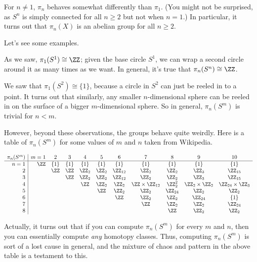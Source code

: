 For $n \neq 1$, $\pi_n$ behaves somewhat differently than $\pi_1$.
(You might not be surprised, as $S^n$ is simply connected for all $n \ge 2$ but not when $n=1$.)
In particular, it turns out that $\pi_n(X)$ is an abelian group for all $n \ge 2$.

Let's see some examples.
\begin{example}
	As we saw, $\pi_1(S^1) \cong \ZZ$; given the base circle $S^1$,
	we can wrap a second circle around it as many times as we want.
	In general, it's true that $\pi_n(S^n) \cong \ZZ$.
\end{example}
\begin{example}
	We saw that $\pi_1(S^2) \cong \{1\}$, because 
	a circle in $S^2$ can just be reeled in to a point.
	It turns out that similarly, any smaller $n$-dimensional sphere
	can be reeled in on the surface of a bigger $m$-dimensional sphere.
	So in general, $\pi_n(S^m)$ is trivial for $n < m$.
\end{example}
However, beyond these observations, the groups behave quite weirdly.
Here is a table of $\pi_n(S^m)$ for some values of $m$ and $n$
taken from Wikipedia.

\[
	\begin{array}{r|rccccccccc}
		\pi_n(S^m) & m = 1 & 2 & 3 & 4 & 5 & 6 & 7 & 8 & 9 & 10 \\ \hline
		n = 1 & \ZZ & \{1\} & \{1\} & \{1\} & \{1\} & \{1\} & \{1\} & \{1\} & \{1\} & \{1\} \\
		2 &  & \ZZ & \ZZ & \Zc2 & \Zc2 & \Zc{12} & \Zc2 & \Zc2 & \Zc3 & \Zc{15}\\
		3 &  &  & \ZZ & \Zc2 & \Zc2 & \Zc{12} & \Zc2 & \Zc2 & \Zc3 & \Zc{15}\\
		4 &  &  &  & \ZZ & \Zc2 & \Zc2 & \ZZ \times \Zc{12} & \Zc2^2 & \Zc2 \times \Zc2 & \Zc{24} \times \Zc3 \\
		5 &  &  &  &  & \ZZ & \Zc2 & \Zc2 & \Zc{24} & \Zc2 & \Zc2 \\
		6 &  &  &  &  &  & \ZZ & \Zc2 & \Zc2 & \Zc{24} & \{1\} \\
		7 &  &  &  &  &  &  & \ZZ & \Zc2 & \Zc2 & \Zc{24} \\
		8 &  &  &  &  &  &  &  & \ZZ & \Zc2 & \Zc2
	\end{array}
\]

Actually, it turns out that if you can compute $\pi_n(S^m)$
for every $m$ and $n$,
then you can essentially compute \emph{any} homotopy classes.
Thus, computing $\pi_n(S^m)$ is sort of a lost cause in general,
and the mixture of chaos and pattern in the above table is a testament to this.

